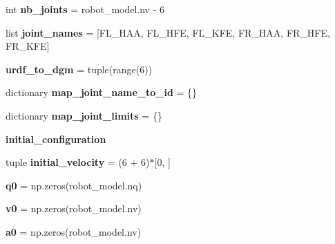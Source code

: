 \begin{DoxyCompactItemize}
int {\bfseries nb\+\_\+joints} = robot\+\_\+model.\+nv -\/ 6
\item 
\mbox{\label{classrobot__properties__bolt_1_1config_1_1BoltConfig_aa87bcf63201b8b78e6dcfbccf07780f5}} 
list {\bfseries joint\+\_\+names} = \mbox{[}\textquotesingle{}F\+L\+\_\+\+H\+AA\textquotesingle{}, \textquotesingle{}F\+L\+\_\+\+H\+FE\textquotesingle{}, \textquotesingle{}F\+L\+\_\+\+K\+FE\textquotesingle{}, \textquotesingle{}F\+R\+\_\+\+H\+AA\textquotesingle{}, \textquotesingle{}F\+R\+\_\+\+H\+FE\textquotesingle{}, \textquotesingle{}F\+R\+\_\+\+K\+FE\textquotesingle{}\mbox{]}
\item 
\mbox{\label{classrobot__properties__bolt_1_1config_1_1BoltConfig_aeb232d8cf65792a9b0d32f2ab997e43e}} 
{\bfseries urdf\+\_\+to\+\_\+dgm} = tuple(range(6))
\item 
\mbox{\label{classrobot__properties__bolt_1_1config_1_1BoltConfig_a597a95163a443768ee1c800e18487673}} 
dictionary {\bfseries map\+\_\+joint\+\_\+name\+\_\+to\+\_\+id} = \{\}
\item 
\mbox{\label{classrobot__properties__bolt_1_1config_1_1BoltConfig_a44b06cd0b41a6d0458a55d152248afd7}} 
dictionary {\bfseries map\+\_\+joint\+\_\+limits} = \{\}
\item 
{\bfseries initial\+\_\+configuration}
\item 
\mbox{\label{classrobot__properties__bolt_1_1config_1_1BoltConfig_a812b933772fdaa3af006db16906ecd67}} 
tuple {\bfseries initial\+\_\+velocity} = (6 + 6)$\ast$\mbox{[}0, \mbox{]}
\item 
\mbox{\label{classrobot__properties__bolt_1_1config_1_1BoltConfig_a3ca925730077785d60c002e54007a82f}} 
{\bfseries q0} = np.\+zeros(robot\+\_\+model.\+nq)
\item 
\mbox{\label{classrobot__properties__bolt_1_1config_1_1BoltConfig_a8a30825588f84a0d61781b0a0667a99c}} 
{\bfseries v0} = np.\+zeros(robot\+\_\+model.\+nv)
\item 
\mbox{\label{classrobot__properties__bolt_1_1config_1_1BoltConfig_a47c3a0f37835ca3d09c2aefffbcc2255}} 
{\bfseries a0} = np.\+zeros(robot\+\_\+model.\+nv)
\end{DoxyCompactItemize}
